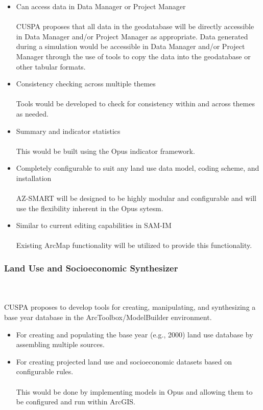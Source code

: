 \documentclass[titlepage]{article}
\begin{document}
\begin{itemize}
	\item Can access data in Data Manager or Project Manager
	\\\\
	CUSPA proposes that all data in the geodatabase will be directly accessible in Data Manager and/or Project Manager as appropriate.  Data generated during a simulation would be accessible in Data Manager and/or Project Manager through the use of tools to copy the data into the geodatabase or other tabular formats.
	\item Consistency checking across multiple themes
	\\\\
	Tools would be developed to check for consistency within and across themes as needed.
	\item Summary and indicator statistics
	\\\\
	This would be built using the Opus indicator framework.
	\item Completely configurable to suit any land use data model, coding scheme, and installation
	\\\\
	AZ-SMART will be designed to be highly modular and configurable and will use the flexibility inherent in the Opus sytesm.
	\item Similar to current editing capabilities in SAM-IM
	\\\\
	Existing ArcMap functionality will be utilized to provide this functionality.
\end{itemize}

\subsubsection{Land Use and Socioeconomic Synthesizer}
\\\\
CUSPA proposes to develop tools for creating, manipulating, and synthesizing a base year database in the ArcToolbox/ModelBuilder environment.
\begin{itemize}
	\item For creating and populating the base year (e.g., 2000) land use database by assembling multiple sources.
	\item For creating projected land use and socioeconomic datasets based on configurable rules.
	\\\\
	This would be done by implementing models in Opus and allowing them to be configured and run within ArcGIS. 
\end{itemize}
\end{document}

